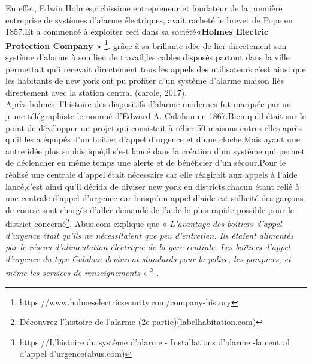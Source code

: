 \documentclass[a4paper, 12pt]{article}
\begin{document}
 
\quad En effet, Edwin Holmes,richissime entrepreneur et fondateur de la première entreprise de systèmes d’alarme électriques, avait racheté le brevet de Pope en 1857.Et a commencé à exploiter  ceci dans sa société\textbf{«Holmes Electric Protection Company »} \footnote{ https://www.holmeselectricsecurity.com/company-history }.  grâce à sa brillante idée de lier directement son système d'alarme à son lieu de travail,les cables disposés partout dans la ville permettait qu'i recevait directement tous les appels des utilisateurs.c'est ainsi que les habitants de new york ont pu profiter d'un système d'alarme maison liès directement avec la station central (carole, 2017). \\[0.25cm]Après holmes, l’histoire des dispositifs d’alarme modernes fut marquée  par un jeune télégraphiste le nommé d’Edward A. Calahan en 1867.Bien qu'il était sur le point de dévélopper un  projet,qui consistait à rélier 50 maisons entres-elles après qu'il les a équipés d'un boitier d'appel d'urgence et d'une cloche,Mais ayant une autre idée plus sophistiqué,il s'est lancé dans la création d'un système qui permet de déclencher en même temps une alerte et de bénéficier d'un sécour.Pour le réalisé une centrale d'appel était nécessaire car elle réagirait aux appels à l'aide lancé,c'est ainsi qu'il décida de diviser new york en districts,chacun étant relié à une centrale d'appel d'urgence car lorsqu'un appel d'aide est sollicité des garçons de course sont chargés d'aller demandé de l'aide le plus rapide possible pour le district concerné\footnote{Découvrez l'histoire de l'alarme (2e partie)(labelhabitation.com)}. Abus.com explique que « \textit{ L’avantage des boîtiers d’appel d’urgence était qu’ils ne nécessitaient que peu d’entretien. Ils étaient alimentés par le réseau d’alimentation électrique de la gare centrale. Les boîtiers d’appel d’urgence du type Calahan devinrent standards pour la police, les pompiers, et même les services de renseignements} » \footnote{https://L’histoire du système d’alarme - Installations d'alarme -la central d'appel d'urgence(abus.com)} .
\end{document}
